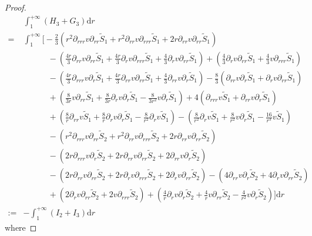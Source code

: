 \documentclass[10pt,reqno]{amsart}
\numberwithin{equation}{section}
\begin{document}
\begin{proof}
		\begin{equation*}
			\begin{aligned}
				&\int_{1}^{+\infty}(H_3+G_3)\mathrm{d}r\\
				=&\int_{1}^{+\infty}\bigg[-\frac{2}{3}(r^2\partial_{rrr}v\partial_{rr}\tilde{S}_1+r^2\partial_{rr}v\partial_{rrr}\tilde{S}_1+2r\partial_{rr}v\partial_{rr}\tilde{S}_1)\\
				&\quad\quad\quad-(\frac{4r}{3}\partial_{rr}v\partial_{rr}\tilde{S}_1+\frac{4r}{3}\partial_{r}v\partial_{rrr}\tilde{S}_1+\frac{4}{3}\partial_{r}v\partial_{rr}\tilde{S}_1)+(\frac{4}{3}\partial_{r}v\partial_{rr}\tilde{S}_1+\frac{4}{3}v\partial_{rrr}\tilde{S}_1)\\
				&\quad\quad\quad-
				(\frac{4r}{3}\partial_{rrr}v\partial_{r}\tilde{S}_1+\frac{4r}{3}\partial_{rr}v\partial_{rr}\tilde{S}_1+\frac{4}{3}\partial_{rr}v\partial_{r}\tilde{S}_1)-\frac{8}{3}(\partial_{rr}v\partial_{r}\tilde{S}_1+\partial_{r}v\partial_{rr}\tilde{S}_1)\\
				&\quad\quad\quad+ (\frac{8}{3r}v\partial_{rr}\tilde{S}_1+\frac{8}{3r}\partial_{r}v\partial_{r}\tilde{S}_1-\frac{8}{3r^2}v\partial_{r}\tilde{S}_1)
				+4(\partial_{rrr}v\tilde{S}_1+\partial_{rr}v\partial_{r}\tilde{S}_1)\\
				&\quad\quad\quad+(\frac{8}{r}\partial_{rr}v\tilde{S}_1+\frac{8}{r}\partial_{r}v
				\partial_{r}\tilde{S}_1-\frac{8}{r^2}\partial_{r}v\tilde{S}_1)
				-( \frac{8}{r^2}\partial_{r}v\tilde{S}_1+\frac{8}{r^2}v\partial_{r}\tilde{S}_1-\frac{16}{r^3}v\tilde{S}_1)\\
				&\quad\quad\quad-(r^2\partial_{rrr}v\partial_{rr}\tilde{S}_2+r^2\partial_{rr}v\partial_{rrr}\tilde{S}_2+2r\partial_{rr}v\partial_{rr}\tilde{S}_2)\\
				&\quad\quad\quad-(2r\partial_{rrr}v\partial_{r}\tilde{S}_2+2r\partial_{rr}v\partial_{rr}\tilde{S}_2+2\partial_{rr}v\partial_{r}\tilde{S}_2)\\
				&\quad\quad\quad-(2r\partial_{rr}v\partial_{rr}\tilde{S}_2+2r\partial_{r}v\partial_{rrr}\tilde{S}_2+2\partial_{r}v\partial_{rr}\tilde{S}_2)
				-(4\partial_{rr}v\partial_{r}\tilde{S}_2+4\partial_{r}v\partial_{rr}\tilde{S}_2)\\
				&\quad\quad\quad+(2\partial_{r}v\partial_{rr}\tilde{S}_2+2v\partial_{rrr}\tilde{S}_2)+(\frac{4}{r}\partial_{r}v\partial_{r}\tilde{S}_2+\frac{4}{r}v\partial_{rr}\tilde{S}_2-\frac{4}{r^2}v\partial_{r}\tilde{S}_2)\bigg]\mathrm{d}r\\
				:=&-\int_{1}^{+\infty}(I_2+I_3)\mathrm{d}r
			\end{aligned}
		\end{equation*}
		where
		

\end{proof}
\end{document}

